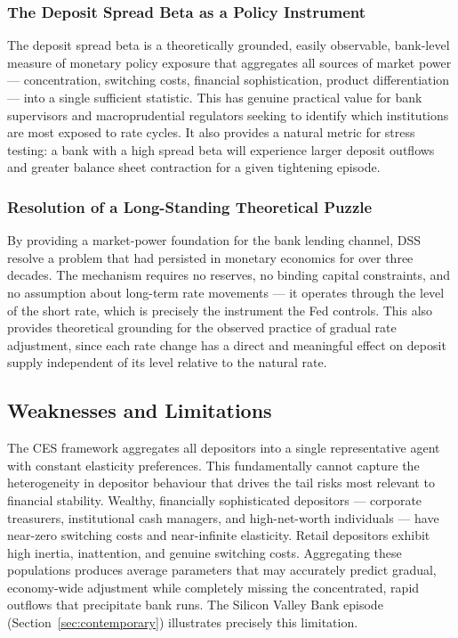 \documentclass[12pt,a4paper]{article}
\begin{document}
\subsubsection{The Deposit Spread Beta as a Policy Instrument}

The deposit spread beta is a theoretically grounded, easily observable,
bank-level measure of monetary policy exposure that aggregates all sources of
market power --- concentration, switching costs, financial sophistication,
product differentiation --- into a single sufficient statistic. This has
genuine practical value for bank supervisors and macroprudential regulators
seeking to identify which institutions are most exposed to rate cycles. It
also provides a natural metric for stress testing: a bank with a high spread
beta will experience larger deposit outflows and greater balance sheet
contraction for a given tightening episode.

\subsubsection{Resolution of a Long-Standing Theoretical Puzzle}

By providing a market-power foundation for the bank lending channel, DSS
resolve a problem that had persisted in monetary economics for over three
decades. The mechanism requires no reserves, no binding capital constraints,
and no assumption about long-term rate movements --- it operates through the
level of the short rate, which is precisely the instrument the Fed controls.
This also provides theoretical grounding for the observed practice of gradual
rate adjustment, since each rate change has a direct and meaningful effect on
deposit supply independent of its level relative to the natural rate.

\subsection{Weaknesses and Limitations}

\begin{critbox}
The CES framework aggregates all depositors into a single representative agent
with constant elasticity preferences. This fundamentally cannot capture the
heterogeneity in depositor behaviour that drives the tail risks most relevant
to financial stability. Wealthy, financially sophisticated depositors ---
corporate treasurers, institutional cash managers, and high-net-worth
individuals --- have near-zero switching costs and near-infinite elasticity.
Retail depositors exhibit high inertia, inattention, and genuine switching
costs. Aggregating these populations produces average parameters that may
accurately predict gradual, economy-wide adjustment while completely missing
the concentrated, rapid outflows that precipitate bank runs. The Silicon
Valley Bank episode (Section~\ref{sec:contemporary}) illustrates precisely
this limitation.
\end{critbox}
\end{document}
